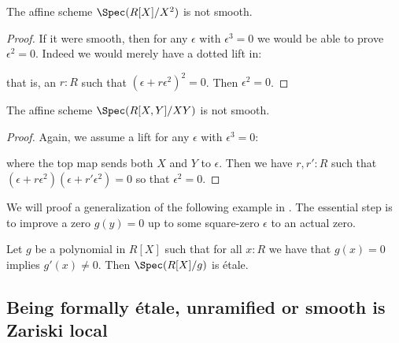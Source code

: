 \begin{example}
The affine scheme $\Spec(R[X]/X^2)$ is not smooth.
\end{example}

\begin{proof}
If it were smooth, then for any $\epsilon$ with $\epsilon^3=0$ we would be able to prove $\epsilon^2=0$.
Indeed we would merely have a dotted lift in:
 \begin{center}
    \end{center}
    that is, an $r:R$ such that $(\epsilon+r\epsilon^2)^2=0$. Then $\epsilon^2=0$.
\end{proof}

\begin{example}
The affine scheme $\Spec(R[X,Y]/XY)$ is not smooth.
\end{example}

\begin{proof}
Again, we assume a lift for any $\epsilon$ with $\epsilon^3=0$:
 \begin{center}
 \end{center}
 where the top map sends both $X$ and $Y$ to $\epsilon$. Then we have $r,r':R$ such that $(\epsilon+r\epsilon^2)(\epsilon+r'\epsilon^2)=0$ so that $\epsilon^2=0$.
\end{proof}

We will proof a generalization of the following example in .
The essential step is to improve a zero $g(y)=0$ up to some square-zero $\epsilon$ to an actual zero.

\begin{example}
Let $g$ be a polynomial in $R[X]$ such that for all $x:R$ we have that $g(x)=0$ implies $g'(x)\not=0$. Then $\Spec(R[X]/g)$ is étale.
\end{example}


\subsection{Being formally étale, unramified or smooth is Zariski local}

